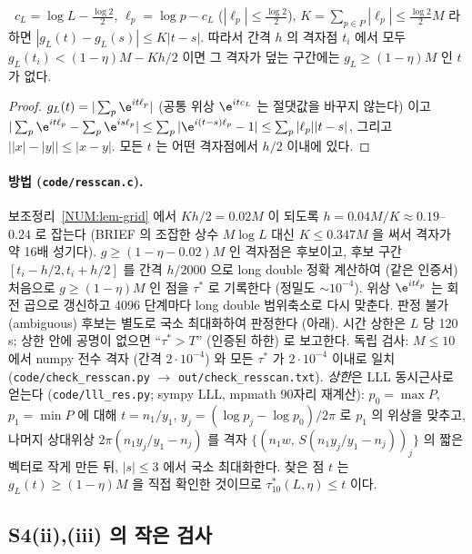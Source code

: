 \begin{lemma}[격자 인증서]\label{NUM:lem-grid}
\PROVED\ $c_L=\log L-\frac{\log 2}{2}$, $\ell_p=\log p-c_L$ ($|\ell_p|\le\frac{\log2}{2}$), $K=\sum_{p\in P}|\ell_p|\le\frac{\log2}{2}M$ 라 하면
$|g_L(t)-g_L(s)|\le K|t-s|$. 따라서 간격 $h$ 의 격자점 $t_i$ 에서 모두 $g_L(t_i)<(1-\eta)M-Kh/2$ 이면
그 격자가 덮는 구간에는 $g_L\ge(1-\eta)M$ 인 $t$ 가 없다.
\end{lemma}
\begin{proof}
$g_L(t)=|\sum_p \e^{it\ell_p}|$ (공통 위상 $\e^{itc_L}$ 는 절댓값을 바꾸지 않는다) 이고
$|\sum_p\e^{it\ell_p}-\sum_p\e^{is\ell_p}|\le\sum_p|\e^{i(t-s)\ell_p}-1|\le\sum_p|\ell_p||t-s|$, 그리고 $\bigl||x|-|y|\bigr|\le|x-y|$.
모든 $t$ 는 어떤 격자점에서 $h/2$ 이내에 있다.
\end{proof}

\paragraph{방법 (\texttt{code/resscan.c}).}
보조정리~\ref{NUM:lem-grid} 에서 $Kh/2=0.02M$ 이 되도록 $h=0.04M/K\approx0.19$--$0.24$ 로 잡는다
(BRIEF 의 조잡한 상수 $M\log L$ 대신 $K\le 0.347M$ 을 써서 격자가 약 16배 성기다).
$g\ge(1-\eta-0.02)M$ 인 격자점은 후보이고, 후보 구간 $[t_i-h/2,t_i+h/2]$ 를 간격 $h/2000$ 으로 long double 정확 계산하여
(같은 인증서) 처음으로 $g\ge(1-\eta)M$ 인 점을 $\tau^*$ 로 기록한다 (정밀도 $\sim10^{-4}$). 위상 $\e^{it\ell_p}$ 는 회전 곱으로 갱신하고
4096 단계마다 long double 범위축소로 다시 맞춘다. 판정 불가(ambiguous) 후보는 별도로 국소 최대화하여 판정한다 (아래).
시간 상한은 $L$ 당 120\,s; 상한 안에 공명이 없으면 ``$\tau^*>T$'' (인증된 하한) 로 보고한다.
독립 검사: $M\le10$ 에서 numpy 전수 격자 (간격 $2\cdot10^{-4}$) 와 모든 $\tau^*$ 가 $2\cdot10^{-4}$ 이내로 일치
(\texttt{code/check\_resscan.py} $\to$ \texttt{out/check\_resscan.txt}).
\emph{상한}은 LLL 동시근사로 얻는다 (\texttt{code/lll\_res.py}; sympy LLL, mpmath 90자리 재계산):
$p_0=\max P$, $p_1=\min P$ 에 대해 $t=n_1/y_1$, $y_j=(\log p_j-\log p_0)/2\pi$ 로 $p_1$ 의 위상을 맞추고,
나머지 상대위상 $2\pi(n_1y_j/y_1-n_j)$ 를 격자 $\{(n_1w,\,S(n_1y_j/y_1-n_j))_j\}$ 의 짧은 벡터로 작게 만든 뒤, $|s|\le3$ 에서 국소 최대화한다.
찾은 점 $t$ 는 $g_L(t)\ge(1-\eta)M$ 을 직접 확인한 것이므로 $\tau^*_{10}(L,\eta)\le t$ 이다.


\subsection{S4(ii),(iii) 의 작은 검사}\label{NUM:ssec-checks}

